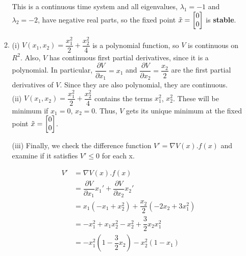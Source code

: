 \documentclass[12pt,a4paper, margin=1in]{article}
\begin{document}
\begin{enumerate}
\begin{enumerate}
            This is a continuous time system and all eigenvalues, $\lambda_1 = -1$ and $\lambda_2 = -2$, have negative real parts, so the fixed point $\Tilde{x} = \begin{bmatrix}
                0 \\ 0
            \end{bmatrix}$ is \textbf{stable}. 

            
            \item (i) $V(x_1, x_2) = \dfrac{x_1^2}{2} + \dfrac{x_2^2}{4}$ is a polynomial function, so $V$ is continuous on $R^2$. Also, $V$ has continuous first partial derivatives, since it is a polynomial.
            In particular, $\dfrac{\partial V}{\partial x_1} = x_1$ and $\dfrac{\partial V}{\partial x_2} = \dfrac{x_2}{2}$ are the first partial derivatives of $V$. Since they are also polynomial, they are continuous.  \\

            (ii) $V(x_1, x_2) = \dfrac{x_1^2}{2} + \dfrac{x_2^2}{4}$ contains the terms $x_1^2$, $x_2^2$. These will be minimum if $x_1 = 0$, $x_2 = 0$. Thus, $V$ gets its unique minimum at the fixed point $\Tilde{x} = \begin{bmatrix}
                0 \\ 0
            \end{bmatrix}$. 
            
            \newpage

            (iii) Finally, we check the difference function $V' = \nabla V(x) . f(x)$ and examine if it satisfies
            $V' \leq 0$ for each x. 

            \begin{center}
            \begin{equation*}
            \begin{split}
                    V' & = \nabla V(x) . f(x) \\
                        & = \dfrac{\partial V}{\partial x_1}x_1' + \dfrac{\partial V}{\partial x_2}x_2' \\
                        & = x_1 (-x_1 + x_2^2) + \dfrac{x_2}{2}(-2x_2 + 3x_1^2) \\
                        & = -x_1^2 + x_1x_2^2 - x_2^2 + \dfrac{3}{2}x_2x_1^2 \\
                        & = -x_1^2(1-\dfrac{3}{2}x_2) - x_2^2(1-x_1)
            \end{split}
            \end{equation*}    
            \end{center}


\end{enumerate}
\end{enumerate}
\end{document}
